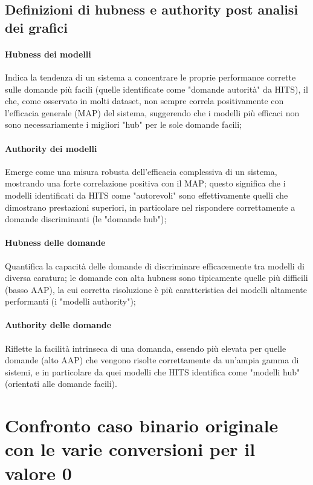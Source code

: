 \documentclass{article}
\begin{document}
\subsection{Definizioni di hubness e authority post analisi dei grafici}

\paragraph{Hubness dei modelli} Indica la tendenza di un sistema a concentrare le proprie performance corrette
sulle domande più facili (quelle identificate come "domande autorità" da HITS),
il che, come osservato in molti dataset, non sempre correla positivamente con
l'efficacia generale (MAP) del sistema, suggerendo che i modelli più efficaci
non sono necessariamente i migliori "hub" per le sole domande facili;
\paragraph{Authority dei modelli} Emerge come una misura robusta dell'efficacia complessiva di un sistema,
mostrando una forte correlazione positiva con il MAP; questo significa che i
modelli identificati da HITS come "autorevoli" sono effettivamente quelli che
dimostrano prestazioni superiori, in particolare nel rispondere correttamente a
domande discriminanti (le "domande hub");
\paragraph{Hubness delle domande} Quantifica la capacità delle domande di discriminare efficacemente tra modelli
di diversa caratura; le domande con alta hubness sono tipicamente quelle più
difficili (basso AAP), la cui corretta risoluzione è più caratteristica dei
modelli altamente performanti (i "modelli authority");
\paragraph{Authority delle domande} Riflette la facilità intrinseca di una domanda, essendo più elevata per quelle
domande (alto AAP) che vengono risolte correttamente da un'ampia gamma di
sistemi, e in particolare da quei modelli che HITS identifica come "modelli
hub" (orientati alle domande facili).

\section{Confronto caso binario originale con le varie conversioni per il valore 0}
\end{document}
